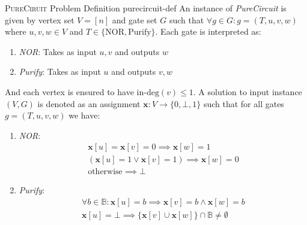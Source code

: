 \begin{definitionbox}{\textsc{PureCiruit} Problem Definition \cite{deligkas_PureCircuitTightInapproximability_2024}}{purecircuit-def}
An instance of \textit{PureCircuit} is given by vertex set $V= [n]$ and gate set $G$ such that
$\forall g \in G: g=(T,u,v,w)$ where $u,v,w \in V$ and $T \in \{\text{NOR}, \text{Purify}\}$.
Each gate is interpreted as:
\begin{enumerate}
    \item \textit{NOR}: Takes as input $u,v$ and outputs $w$
    \item \textit{Purify}: Takes as input $u$ and outputs $v,w$
\end{enumerate}
And each vertex is ensured to have $\text{in-deg}(v) \leq 1$.
A solution to input instance $(V,G)$ is denoted as an assignment $\mathbf{x} : V \to \{0, \bot, 1\}$
such that for all gates $g = (T,u,v,w)$ we have:
\begin{enumerate}
    \item \textit{NOR}:
       \begin{gather*}
            \mathbf{x}[u] = \mathbf{x}[v] = 0 \implies \mathbf{x}[w] = 1\\
            (\mathbf{x}[u] =1 \vee \mathbf{x}[v] =1) \implies \mathbf{x}[w] = 0 \\
            \text{otherwise} \implies \bot
        \end{gather*}

    \item \textit{Purify}: 
       \begin{gather*}
           \forall b \in \mathbb{B}: \mathbf{x}[u] = b \implies \mathbf{x}[v] = b \wedge \mathbf{x}[w] =  b\\
           \mathbf{x}[u] = \bot \implies \{\mathbf{x}[v] \cup \mathbf{x}[w] \} \cap \mathbb{B}\neq \emptyset
        \end{gather*}
\end{enumerate}
\end{definitionbox}

